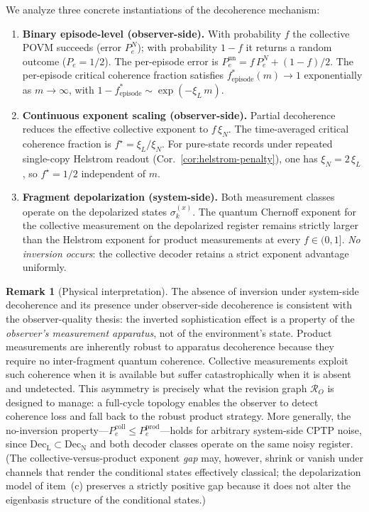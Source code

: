 \documentclass[11pt]{article}
\newcommand{\cR}{\mathcal{R}}
\newcommand{\1}{\mathbf{1}}
\newcommand{\QCBdist}{\xi}
\theoremstyle{definition}
\newtheorem{remark}{Remark}
\theoremstyle{plain}
\begin{document}
We analyze three concrete instantiations of the decoherence mechanism:

\begin{enumerate}[leftmargin=2.2em,label=(\alph*)]
  \item \textbf{Binary episode-level (observer-side).}
    With probability $f$ the collective POVM succeeds (error $P_e^N$);
    with probability $1{-}f$ it returns a random outcome ($P_e = 1/2$).
    The per-episode error is $P_e^{\mathrm{un}} = f\,P_e^N + (1{-}f)/2$.
    The per-episode critical coherence fraction satisfies
    $f^*_{\mathrm{episode}}(m) \to 1$ exponentially as $m \to \infty$,
    with $1 - f^*_{\mathrm{episode}} \sim \exp(-\QCBdist_L\,m)$.

  \item \textbf{Continuous exponent scaling (observer-side).}
    Partial decoherence reduces the effective collective exponent to
    $f\,\QCBdist_N$.  The time-averaged critical coherence fraction is
    $f^\star = \QCBdist_L / \QCBdist_N$.  For pure-state records under repeated single-copy Helstrom readout (Cor.~\ref{cor:helstrom-penalty}), one has
    $\QCBdist_N = 2\,\QCBdist_L$, so $f^\star = 1/2$
    independent of $m$.

  \item \textbf{Fragment depolarization (system-side).}
    Both measurement classes operate on the depolarized states
    $\sigma_k^{(x)}$.  The quantum Chernoff exponent for the collective
    measurement on the depolarized register remains strictly larger than
    the Helstrom exponent for product measurements at every
    $f \in (0,1]$.  \emph{No inversion occurs}: the collective decoder
    retains a strict exponent advantage uniformly.
\end{enumerate}

\begin{remark}[Physical interpretation]
\label{rem:decoherence-physical}
The absence of inversion under system-side decoherence and its presence under observer-side decoherence is consistent with the observer-quality thesis: the inverted sophistication effect is a property of the \emph{observer's measurement apparatus}, not of the environment's state.  Product measurements are inherently robust to apparatus decoherence because they require no inter-fragment quantum coherence.  Collective measurements exploit such coherence when it is available but suffer catastrophically when it is absent and undetected.  This asymmetry is precisely what the revision graph $\cR_O$ is designed to manage: a full-cycle topology enables the observer to detect coherence loss and fall back to the robust product strategy.
More generally, the no-inversion property---$P_e^{\mathrm{coll}}\le P_e^{\mathrm{prod}}$---holds for arbitrary system-side CPTP noise, since $\mathrm{Dec}_{\mathrm{L}}\subset\mathrm{Dec}_{\mathrm{N}}$ and both decoder classes operate on the same noisy register.  (The collective-versus-product exponent \emph{gap} may, however, shrink or vanish under channels that render the conditional states effectively classical; the depolarization model of item~(c) preserves a strictly positive gap because it does not alter the eigenbasis structure of the conditional states.)
\end{remark}
\end{document}
